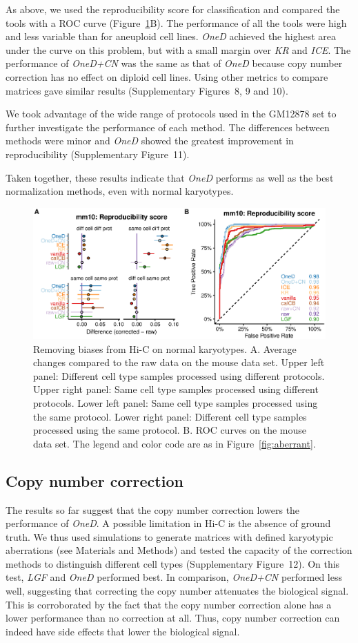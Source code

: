 \documentclass[a4,center,fleqn]{NAR}
\begin{document}
As above, we used the reproducibility score for classification and
compared the tools with a ROC curve (Figure~\ref{fig:normal}B). The
performance of all the tools were high and less variable than for
aneuploid cell lines. \textit{OneD} achieved the highest area under the
curve on this problem, but with a small margin over \textit{KR} and
\textit{ICE}. The performance of \textit{OneD+CN} was the same as that of
\textit{OneD} because copy number correction has no effect on diploid cell
lines. Using other metrics to compare matrices gave similar results
(Supplementary Figures~8, 9 and 10).

We took advantage of the wide range of protocols used in the GM12878 set to
further investigate the performance of each method. The differences between
methods were minor and \textit{OneD} showed the greatest improvement in
reproducibility (Supplementary Figure~11).

Taken together, these results indicate that \textit{OneD} performs as well
as the best normalization methods, even with normal karyotypes.

\begin{figure}
\centerline{\includegraphics[width=.49\textwidth]
  {nar_figures/figure_3.eps}}
\caption{Removing biases from Hi-C on normal karyotypes. A. Average
  changes compared to the raw data on the mouse data set.
  Upper left panel: Different cell type samples
processed using different protocols. Upper right panel: Same cell
type samples processed using different protocols. Lower left panel:
Same cell type samples processed using the same protocol. Lower right panel:
Different cell type samples processed using the same protocol. B. ROC curves on
the mouse data set. The legend and color code are as in Figure~\ref{fig:aberrant}.}
\label{fig:normal}
\end{figure}


\subsection{Copy number correction}

The results so far suggest that the copy number correction lowers the
performance of \textit{OneD}. A possible limitation in Hi-C is the absence
of ground truth. We thus used simulations to generate matrices with
defined karyotypic aberrations (see Materials and Methods) and tested the
capacity of the correction methods to distinguish different cell types
(Supplementary Figure~12). On this test, \textit{LGF} and \textit{OneD}
performed best. In comparison, \textit{OneD+CN} performed less well,
suggesting that correcting the copy number attenuates the biological
signal. This is corroborated by the fact that the copy number correction
alone has a lower performance than no correction at all. Thus, copy number
correction can indeed have side effects that lower the biological signal.
\end{document}

